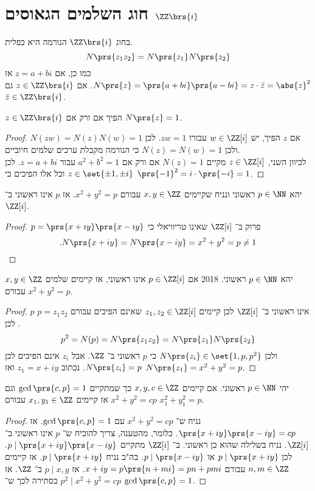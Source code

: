 \documentclass[a4paper,10pt,twoside,openany]{book}
\begin{document}
\section{חוג השלמים הגאוסים
$\ZZ\brs{i}$}
\begin{remark}
בחוג
$\ZZ\brs{i}$
הנורמה היא כפלית.
\[N\prs{z_1 z_2} = N\prs{z_1} N\prs{z_2}\]
כמו כן, אם
$z = a+bi$
אז
$N\prs{z} = \prs{a+bi}\prs{a-bi}=z\cdot\bar{z} = \abs{z}^2$.
אם
$z \in \ZZ\brs{i}$
גם
$\bar{z} \in \ZZ\brs{i}$.
\end{remark}
\begin{proposition}
$z \in \ZZ\brs{i}$
הפיך אם ורק אם
$N\prs{z} = 1$.
\end{proposition}
\begin{proof}
אם
$z$
הפיך, יש
$w \in \ZZ[i]$
עבורו
$zw = 1$.
לכן
$N(zw) = N(z)N(w) = 1$
ולכן
$N(z) = N(w) = 1$
כי הנורמה מקבלת ערכים שלמים חיוביים.\\
לכיוון השני,
$z \in \ZZ[i]$
מקיים
$N(z) = 1$
אם ורק אם
$a^2 + b^2 = 1$
עבור
$z = a+bi$.
לכן
$z \in \set{\pm 1, \pm i}$
וכל אלו הפיכים כי
$\prs{-1}^2 = i \cdot \prs{-i} = 1$.
\end{proof}
\begin{proposition}
יהא
$p \in \NN$
ראשוני ונניח שקיימים
$x,y \in \ZZ$
עבורם
$x^2 + y^2 = p$.
אז
$p$
אינו ראשוני ב־%
$\ZZ[i]$.
\end{proposition}
\begin{proof}
$p = \prs{x+iy}\prs{x-iy}$
פרוק ב־%
$\ZZ[i]$
שאינו טריוויאלי כי
\[\text{.} N\prs{x+iy} = N\prs{x-iy} = x^2 + y^2 = p \neq 1\]
\end{proof}
\begin{proposition}
יהא
$p \in \NN$
ראשוני.%
%
{2018}
אם
$p \in \ZZ[i]$
אינו ראשוני, אז קיימים שלמים
$x,y \in \ZZ$
עבורם
$x^2 + y^2 = p$.
\end{proposition}
\begin{proof}
$p$
אינו ראשוני ב־%
$\ZZ[i]$
לכן קיימים
$z_1,z_2 \in \ZZ[i[$
שאינם הפיכים עבורם
$p = z_1 z_2$.
לכן
\[p^2 = N(p) = N\prs{z_1 z_2} = N\prs{z_1} N\prs{z_2}\]
ולכן
$N\prs{z_i} \in \set{1,p,p^2}$
כי
$p$
ראשוני ב־%
$\ZZ$.
אבל
$z_i$
אינם הפיכים לכן
$N\prs{z_i} = p$.
נכתוב
$z_1 = x+iy$
ואז
$N\prs{z_1} = x^2 + y^2 = p$.
\end{proof}
\begin{theorem}
יהי
$p \in \NN$
ראשוני.
אם קיימים
$x,y,c \in \ZZ$
כך שמתקיים
$\gcd\prs{c,p}=1$
וגם
$x^2 + y^2 = cp$
אז קיימים
$x_1,y_1 \in \ZZ$
עבורם
$x_1^2 + y_1^2 = p$.
\end{theorem}
\begin{proof}
נניח ש־%
$x^2 + y^2 = cp$
עם
$\gcd\prs{c,p} = 1$.
אז
$\prs{x+iy}\prs{x-iy} = cp$.
כלומר, מהטענה, צריך להוכיח ש־%
$p$
אינו ראשוני ב־%
$\ZZ[i]$.
נניח בשלילה שהוא כן ראשוני.
ב־%
$\ZZ[i]$
מתקיים
$p \mid \prs{x+iy}\prs{x-iy}$.
לכן
$p \mid \prs{x+iy}$
או
$p \mid \prs{x-iy}$.
בה"כ נניח
$p \mid \prs{x+iy}$.
אז קיימים
$n,m \in \ZZ$
עבורם
$x+iy = p\prs{n+mi} = pn + pmi$.
אז
$p \mid x,y$
ב־%
$\ZZ$.
אז
$p^2 \mid x^2 + y^2 = cp$
בסתירה לכך ש־%
$\gcd\prs{c,p} = 1$.
\end{proof}
\end{document}
